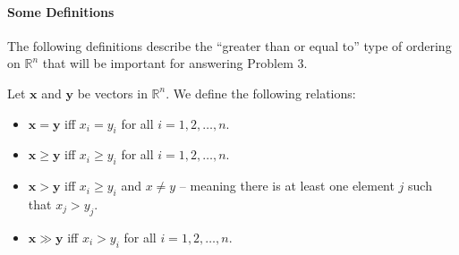 \documentclass[a4paper,11pt]{article}
\begin{document}
\paragraph{Some Definitions}
The following definitions describe the ``greater than or equal to'' type of ordering on $\mathbb{R}^n$ that will be important for answering Problem 3.
\begin{definition}
	Let $\mathbf{x}$ and $\mathbf{y}$ be vectors in $\mathbb{R}^n$.  We define the following relations:
	\begin{itemize}
		\item $\mathbf{x} = \mathbf{y}$ iff $x_i = y_i$ for all $i=1,2,\dots, n$.
		\item $\mathbf{x} \geq \mathbf{y}$ iff $x_i \geq y_i$ for all $i=1,2,\dots, n$.
		\item $\mathbf{x} > \mathbf{y}$ iff $x_i \geq y_i$ and $x\neq y$ -- meaning there is at least one element $j$ such that $x_j > y_j$.
		\item $\mathbf{x} \gg \mathbf{y}$ iff $x_i > y_i$ for all $i=1,2,\dots, n$.
	\end{itemize}
\end{definition}
\end{document}
